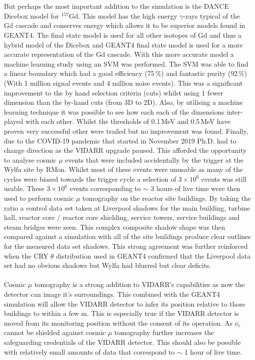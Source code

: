 \\\\But perhaps the most important addition to the simulation is the DANCE Dicebox model for $^157$Gd. This model has the high energy $\gamma$-rays typical of the Gd cascade and conserves energy which allows it to be superior models found in GEANT4. The final state model is used for all other isotopes of Gd and thus a hybrid model of the Dicebox and GEANT4 final state model is used for a more accurate representation of the Gd cascade. With this more accurate model a machine learning study using an SVM was performed. The SVM was able to find a linear boundary which had a good efficiency (75\,\%) and fantastic purity (92\,\%) (With 1 million signal events and 4 million noise events). This was a significant improvement to the by hand selection criteria (cuts) whilst using 1 fewer dimension than the by-hand cuts (from 3D to 2D). Also, by utilising a machine learning technique it was possible to see how each each of the dimensions inter-played with each other. Whilst the thresholds of 0.1\,MeV and 0.5\,MeV have proven very successful other were trailed but no improvement was found. 
Finally, due to the COVID-19 pandemic that started in November 2019 Ph.D. had to change direction as the VIDARR upgrade paused. This afforded the opportunity to analyse cosmic $\mu$ events that were included accidentally by the trigger at the Wylfa site by RMon. Whilst most of these events were unusable as many of the cycles were biased towards the trigger cycle a selection of $3\times 10^6$ events was still usable. These $3\times 10^6$ events corresponding to $\sim$ 3 hours of live time were then used to perform cosmic $\mu$ tomography on the reactor site buildings. By taking the ratio a control data set taken at Liverpool shadows for the main building, turbine hall, reactor core / reactor core shielding, service towers, service buildings and steam bridges were seen. This complex composite shadow shape was then compared against a simulation with all of the site buildings produce clear outlines for the measured data set shadows. This strong agreement was further reinforced when the CRY \cite{ieee_cry_2007} $\theta$ distribution used in GEANT4 confirmed that the Liverpool data set had no obvious shadows but Wylfa had blurred but clear deficits. 
\\\\Cosmic $\mu$ tomography is a strong addition to VIDARR's capabilities as now the detector can image it's surroundings. This combined with the GEANT4 simulation will allow the VIDARR detector to infer its position relative to those buildings to within a few m. This is especially true if the VIDARR detector is moved from its monitoring position without the consent of its operation. As $\bar{\nu_e}$ cannot be shielded against cosmic $\mu$ tomography further increases the safeguarding credentials of the VIDARR detector. This should also be possible with relatively small amounts of data that correspond to $\sim$ 1 hour of live time. 
